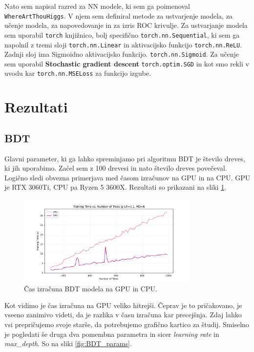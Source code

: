 \documentclass[a4paper]{article}
\begin{document}
Nato sem napisal razred za NN modele, ki sem ga poimenoval \texttt{WhereArtThouHiggs}. V njem sem definiral metode za
ustvarjenje modela, za učenje modela, za napovedovanje in za izris ROC krivulje. Za ustvarjanje modela sem uporabil
\texttt{torch} knjižnico, bolj specifično \texttt{torch.nn.Sequential}, ki sem ga napolnil z tremi sloji 
\texttt{torch.nn.Linear} in aktivacijsko funkcijo \texttt{torch.nn.ReLU}. Zadnji sloj ima Sigmoidno aktivacijsko funkcijo.
\texttt{torch.nn.Sigmoid}. Za učenje sem uporabil \textbf{Stochastic gradient descent} \texttt{torch.optim.SGD} in kot smo 
rekli v uvodu kar \texttt{torch.nn.MSELoss} za funkcijo izgube.
\section{Rezultati}
\subsection{BDT}
Glavni parameter, ki ga lahko spreminjamo pri algoritmu BDT je število dreves, ki jih uporabimo. Začel sem z 100 drevesi in
nato število dreves povečeval. Logično sledi obvezna primerjava med časom izračunov na GPU in na CPU. GPU je RTX 3060Ti,
CPU pa Ryzen 5 3600X. Rezultati so prikazani na sliki \ref{fig:BDT_times}. \\

\begin{figure}[H]
    \centering
    \includegraphics[width=0.8\textwidth]{../images/raw_performance.png}
    \caption{Čas izračuna BDT modela na GPU in CPU.}
    \label{fig:BDT_times}
\end{figure}

Kot vidimo je čas izračuna na GPU veliko hitrejši. Čeprav je to pričakovano, je vseeno zanimivo videti, da je razlika v času
izračuna kar precejšnja. Zdaj lahko vsi prepričujemo svoje starše, da potrebujemo grafično kartico za študij. Smiselno je pogledati
še druga dva pomembna parametra in sicer \textit{learning rate} in \textit{max\_depth}. So na sliki \ref{fig:BDT_params}. \\
\end{document}
